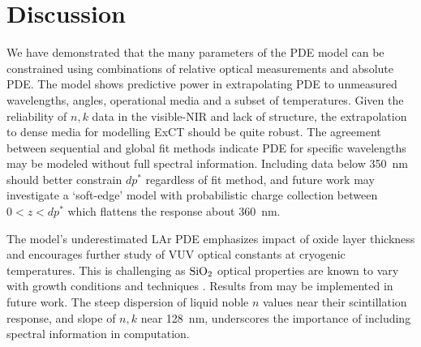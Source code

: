 \section{Discussion}
\label{sec:discussion}








We have demonstrated that the many parameters of the PDE model can be constrained using combinations of relative optical measurements and absolute PDE. The model shows predictive power in extrapolating PDE to unmeasured wavelengths, angles, operational media and a subset of temperatures. Given the reliability of $n, k$ data in the visible-NIR and lack of structure, the extrapolation to dense media for modelling ExCT should be quite robust. The agreement between sequential and global fit methods indicate PDE for specific wavelengths may be modeled without full spectral information. %
Including data below 350~nm should better constrain $dp^*$ regardless of fit method, and future work may investigate a `soft-edge' model with probabilistic charge collection between $0<z<dp^*$ which flattens the response about 360~nm.

The model's underestimated LAr PDE emphasizes impact of oxide layer thickness and encourages further study of VUV optical constants at cryogenic temperatures. This is challenging as $\sio$ optical properties are known to vary with growth conditions and techniques \cite{sio2_properties1, sio2_properties2, SiO2_dep_2001_khodier}. Results from \cite{sio2_properties1} may be implemented in future work. The steep dispersion of liquid noble $n$ values near their scintillation response, and slope of \sio $n, k$ near 128~nm, underscores the importance of including spectral information in computation.%

